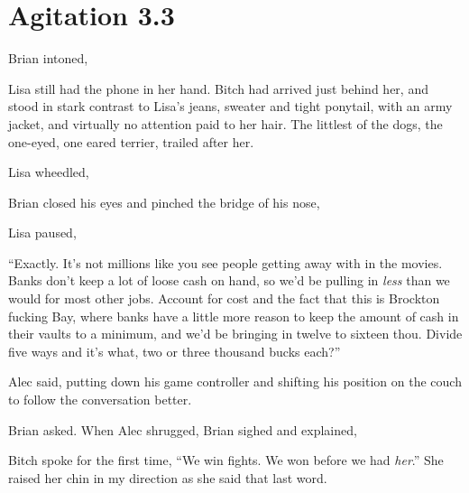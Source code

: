 \chapter{Agitation 3.3}

 Brian intoned, 

Lisa still had the phone in her hand. Bitch had arrived just behind her, and stood in stark contrast to Lisa's jeans, sweater and tight ponytail, with an army jacket, and virtually no attention paid to her hair. The littlest of the dogs, the one-eyed, one eared terrier, trailed after her.

 Lisa wheedled, 

 Brian closed his eyes and pinched the bridge of his nose, 

Lisa paused, 

“Exactly. It's not millions like you see people getting away with in the movies. Banks don't keep a lot of loose cash on hand, so we'd be pulling in {\em less} than we would for most other jobs. Account for cost and the fact that this is Brockton fucking Bay, where banks have a little more reason to keep the amount of cash in their vaults to a minimum, and we'd be bringing in twelve to sixteen thou. Divide five ways and it's what, two or three thousand bucks each?”

 Alec said, putting down his game controller and shifting his position on the couch to follow the conversation better.

 Brian asked. When Alec shrugged, Brian sighed and explained, 

 Bitch spoke for the first time, “We win fights. We won before we had {\em her}.” She raised her chin in my direction as she said that last word.


